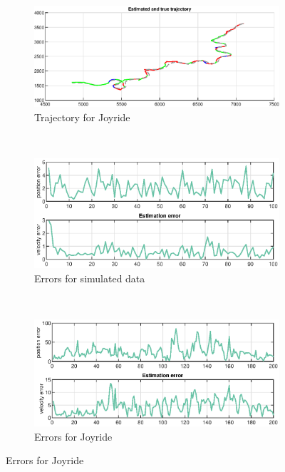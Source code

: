 \begin{figure}[ht]
\begin{subfigure}[h]{0.4\textwidth}
    \end{subfigure}%
    ~
    \begin{subfigure}[h]{0.4\textwidth}
        \includegraphics[width=\textwidth]{figures/ga_1/joyride_estimated_trajectory}
        \caption{Trajectory for Joyride}
        \label{fig:ga_1_joyride_estimated_trajectory}
    \end{subfigure}
        \\
    \begin{subfigure}[h]{0.4\textwidth}
        \includegraphics[width=\textwidth]{figures/ga_1/2_error}
        \caption{Errors for simulated data}
        \label{fig:ga_1_2_error}
    \end{subfigure}%
    ~
    \begin{subfigure}[h]{0.4\textwidth}
        \includegraphics[width=\textwidth]{figures/ga_1/joyride_error}
        \caption{Errors for Joyride}

\end{subfigure}
\end{figure}
